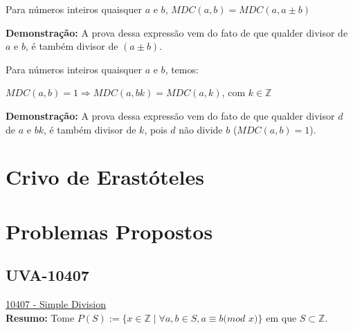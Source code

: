 \begin{corollary}\label{corolario_gcd_soma}
Para números inteiros quaisquer $a$ e $b$, $MDC(a,b) = MDC(a,a \pm b)$
\end{corollary}
\textbf{Demonstração:}
A prova dessa expressão vem do fato de que qualder divisor de $a$ e $b$, é também divisor de $(a \pm b)$.



\begin{corollary}\label{corolario_gcd_produto}
Para números inteiros quaisquer $a$ e $b$, temos:

$MDC(a,b) = 1 \Rightarrow MDC(a,bk) = MDC(a,k)$, com $k \in \mathbb{Z}$
\end{corollary}
\textbf{Demonstração:}
A prova dessa expressão vem do fato de que qualder divisor $d$ de $a$ e $bk$, é também divisor de $k$, pois $d$ não divide $b$ ($MDC(a,b) = 1$).



\section{Crivo de Erastóteles}






\section{Problemas Propostos}


\subsection{UVA-10407}
\href{https://uva.onlinejudge.org/index.php?option=onlinejudge&page=show_problem&problem=1348}{10407 - Simple Division} \\

\textbf{Resumo:} 
Tome $P(S) := \{ x \in \mathbb{Z} \mid  \forall a , b \in S , a \equiv b ( mod$ $x)\}$ em que $S \subset \mathbb{Z}$.

